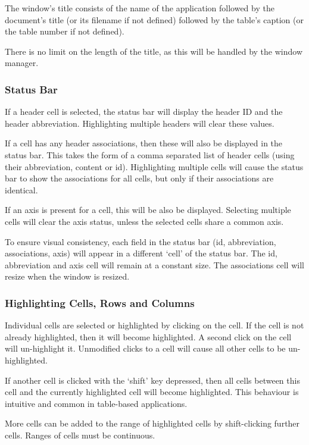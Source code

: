 The window's title consists of the name of the application followed by the
document's title (or its filename if not defined) followed by the table's
caption (or the table number if not defined).

There is no limit on the length of the title, as this will be handled by the
window manager.

\subsubsection{Status Bar}

If a header cell is selected, the status bar will display the header ID and the
header abbreviation. Highlighting multiple headers will clear these values.

If a cell has any header associations, then these will also be displayed in the
status bar. This takes the form of a comma separated list of header cells
(using their abbreviation, content or id). Highlighting multiple cells will
cause the status bar to show the associations for all cells, but only if their
associations are identical.

If an axis is present for a cell, this will be also be displayed. Selecting
multiple cells will clear the axis status, unless the selected cells share a
common axis.

To ensure visual consistency, each field in the status bar (id, abbreviation,
associations, axis) will appear in a different `cell' of the status bar. The
id, abbreviation and axis cell will remain at a constant size. The associations
cell will resize when the window is resized.

\subsubsection{Highlighting Cells, Rows and Columns}

Individual cells are selected or highlighted by clicking on the cell. If the
cell is not already highlighted, then it will become highlighted. A second
click on the cell will un-highlight it. Unmodified clicks to a cell will cause
all other cells to be un-highlighted.

If another cell is clicked with the `shift' key depressed, then all cells
between this cell and the currently highlighted cell will become highlighted.
This behaviour is intuitive and common in table-based applications.

More cells can be added to the range of highlighted cells by shift-clicking
further cells. Ranges of cells must be continuous.

